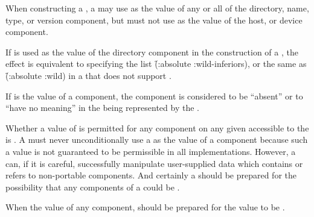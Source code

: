 When constructing a ,
a  may use  as the value of any or all of
the directory, name, type, 
or version component, but must not use  as the value of the host,
or device component.

If  is used as the value of the directory component in the construction
of a , the effect is equivalent to specifying the list
\f{(:absolute :wild-inferiors)},
or the same as \f{(:absolute :wild)} in a  that does not support
.

\endsubsubsubsection%


If  is the value of a  component,
the component is considered to be ``absent'' 
or to ``have no meaning''
in the  being represented by the .

Whether a value of  is permitted for any component
on any given  accessible to the 
is .
A  must never unconditionally use a
 as the value of a  component because
such a value is not guaranteed to be permissible in all implementations.
However, a  can, if it is careful, 
successfully manipulate user-supplied data 
which contains or refers to non-portable  components.
And certainly a  should be prepared for the
possibility that any components of a  could be .

When  the value of any  component,
 should be prepared for the value to be .

